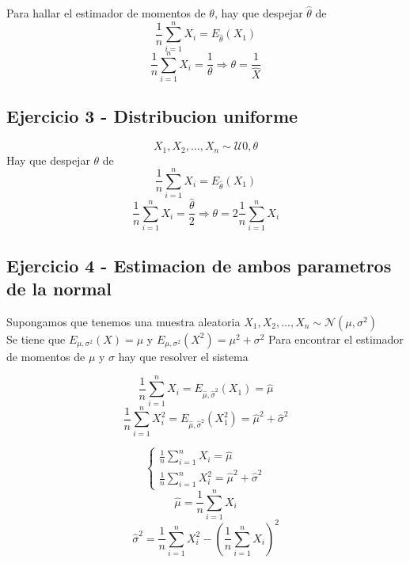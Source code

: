 \documentclass[a4paper]{article}
\begin{document}
Para hallar el estimador de momentos de $\theta$, hay que despejar $\widehat{\theta}$ de
\begin{equation*}
    \frac{1}{n} \sum_{i=1}^n X_{i} = E_{\widehat{\theta}}(X_{1})
\end{equation*}
\begin{equation*}
    \frac{1}{n} \sum_{i=1}^n X_{i} = \frac{1}{\mathcal{\theta}} \Rightarrow \mathcal{\theta} = \frac{1}{\widehat{X}}
\end{equation*}

\subsection{Ejercicio 3 - Distribucion uniforme}
\begin{equation*}
    X_{1}, X_{2}, \dots , X_{n} \sim \mathcal{U}{0, \theta}
\end{equation*}
Hay que despejar $\theta$ de
\begin{equation*}
    \frac{1}{n} \sum_{i=1}^n X_{i} = E_{\widehat{\theta}}(X_{1})
\end{equation*}
\begin{equation*}
    \frac{1}{n} \sum_{i=1}^n X_{i} = \frac{\widehat{\theta}}{2} \Rightarrow \mathcal{\theta} = 2\frac{1}{n}\sum_{i=1}^{n} X_{i}
\end{equation*}

\subsection{Ejercicio 4 - Estimacion de ambos parametros de la normal}
Supongamos que tenemos una muestra aleatoria $X_{1}, X_{2},\dots,X_{n} \sim \mathcal{N}(\mu, \sigma^2)$ \\
Se tiene que $E_{\mu, \sigma^2}(X) = \mu$ y $E_{\mu, \sigma^2}(X^2) = \mu^2 + \sigma^2$
Para encontrar el estimador de momentos de $\mu$ y $\sigma$ hay que resolver el sistema

\begin{equation*}
    \frac{1}{n} \sum_{i=1}^n X_{i} = E_{\widehat{\mu}, \widehat{\sigma}^2}(X_{1}) = \widehat{\mu}
\end{equation*}
\begin{equation*}
    \frac{1}{n} \sum_{i=1}^n X_{i}^2 = E_{\widehat{\mu}, \widehat{\sigma}^2}(X_{1}^2) = \widehat{\mu}^2 + \widehat{\sigma}^2
\end{equation*}

\begin{equation*}
    \begin{cases}
        \frac{1}{n} \sum_{i=1}^n X_{i} = \widehat{\mu}
        \\
        \frac{1}{n} \sum_{i=1}^n X_{i}^2 = \widehat{\mu}^2 + \widehat{\sigma}^2
        \end{cases}
\end{equation*}
\begin{equation*}
    \widehat{\mu} = \frac{1}{n} \sum_{i=1}^n X_{i}
\end{equation*}
\begin{equation*}
    \widehat{\sigma}^2 = \frac{1}{n} \sum_{i=1}^n X_{i}^2 - (\frac{1}{n} \sum_{i=1}^n X_{i})^2
\end{equation*}
\end{document}
